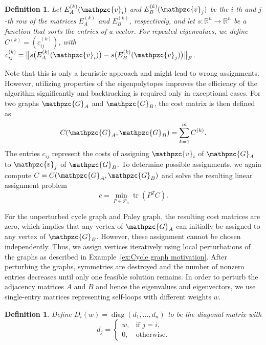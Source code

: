 \documentclass
[
    a4paper,
    DIV=11,
    abstracton
]
{scrartcl}
\newcommand{\R}{\mathbb{R}}
\newcommand{\mc}[1]{\mathpzc{#1}}
\DeclareMathOperator{\diag}{diag}
\DeclareMathOperator{\tr}{tr}
\newtheorem{definition}[theorem]{Definition}
\theoremstyle{definition}
\begin{document}
\begin{definition}
Let $ E_A^{(k)}(\mc{v}_i) $ and $ E_B^{(k)}(\mc{v}_j) $ be the $ i $-th and $ j $-th row of the matrices $ E_A^{(k)} $ and $ E_B^{(k)} $, respectively, and let $ s : \R^n \to \R^n $ be a function that sorts the entries of a vector. For repeated eigenvalues, we define $ C^{(k)} = (c_{ij}^{(k)}) $, with $ c_{ij}^{(k)} = \big\lVert s \big( E_A^{(k)}(\mc{v}_i) \big) - s \big( E_B^{(k)}(\mc{v}_j) \big) \big\rVert_F $.
\end{definition}

Note that this is only a heuristic approach and might lead to wrong assignments. However, utilizing properties of the eigenpolytopes improves the efficiency of the algorithm significantly and backtracking is required only in exceptional cases. For two graphs $ \mc{G}_A $ and $ \mc{G}_B $, the cost matrix is then defined as
\begin{equation*}
    C(\mc{G}_A, \mc{G}_B) = \sum_{k=1}^m C^{(k)}.
\end{equation*}
The entries $ c_{ij} $ represent the costs of assigning $ \mc{v}_i $ of $ \mc{G}_A $ to $ \mc{v}_j $ of $ \mc{G}_B $. To determine possible assignments, we again compute $ C = C(\mc{G}_A, \mc{G}_B) $ and solve the resulting linear assignment problem
\begin{equation*}
    c = \min_{P \in \mathcal{P}_n} \tr \left (P^T C \right).
\end{equation*}

For the unperturbed cycle graph and Paley graph, the resulting cost matrices are zero, which implies that any vertex of $ \mc{G}_A $ can initially be assigned to any vertex of $ \mc{G}_B $. However, these assignment cannot be chosen independently. Thus, we assign vertices iteratively using local perturbations of the graphs as described in Example~\ref{ex:Cycle graph motivation}. After perturbing the graphs, symmetries are destroyed and the number of nonzero entries decreases until only one feasible solution remains. In order to perturb the adjacency matrices $ A $ and $ B $ and hence the eigenvalues and eigenvectors, we use single-entry matrices representing self-loops with different weights $ w $.

\begin{definition}
Define $ D_i(w) = \diag(d_1, \dots, d_n) $ to be the diagonal matrix with
\begin{equation*}
    d_j =
    \begin{cases}
        w, & \text{if } j = i, \\
        0, & \text{otherwise}.
    \end{cases}
\end{equation*}
\end{definition}
\end{document}
